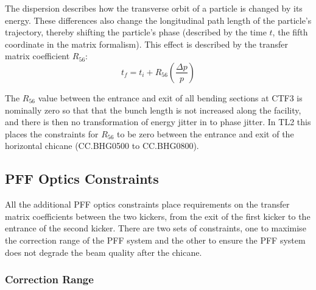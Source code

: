 The dispersion describes how the transverse orbit of a particle is changed by its energy. These differences also change the longitudinal path length of the particle's trajectory, thereby shifting the particle's phase (described by the time \(t\), the fifth coordinate in the matrix formalism). This effect is described by the transfer matrix coefficient \(R_{56}\):
\begin{equation}
t_{f} = t_{i} + R_{56}\left(\frac{\Delta p}{p}\right)
\end{equation}

The \(R_{56}\) value between the entrance and exit of all bending sections at CTF3 is nominally zero so that that the bunch length is not increased along the facility, and there is then no transformation of energy jitter in to phase jitter. In TL2 this places the constraints for \(R_{56}\) to be zero between the entrance and exit of the horizontal chicane (CC.BHG0500 to CC.BHG0800).

\subsection{PFF Optics Constraints}
\label{ss:pffOpticsReqs}

All the additional PFF optics constraints place requirements on the transfer matrix coefficients between the two kickers, from the exit of the first kicker to the entrance of the second kicker. There are two sets of constraints, one to maximise the correction range of the PFF system and the other to ensure the PFF system does not degrade the beam quality after the chicane.

\subsubsection{Correction Range}

